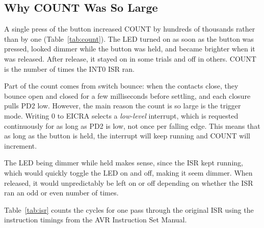 \documentclass[11pt]{article}
\begin{document}
\subsection{Why COUNT Was So Large}
A single press of the button increased COUNT by hundreds of thousands rather than by one (Table~\ref{tab:count}). The LED turned on as soon as the button was pressed, looked dimmer while the button was held, and became brighter when it was released. After release, it stayed on in some trials and off in others. COUNT is the number of times the INT0 ISR ran.

Part of the count comes from switch bounce: when the contacts close, they bounce open and closed for a few milliseconds before settling, and each closure pulls PD2 low. However, the main reason the count is so large is the trigger mode. Writing 0 to EICRA selects a \emph{low-level} interrupt, which is requested continuously for as long as PD2 is low, not once per falling edge. This means that as long as the button is held, the interrupt will keep running and COUNT will increment.

The LED being dimmer while held makes sense, since the ISR kept running, which would quickly toggle the LED on and off, making it seem dimmer. When released, it would unpredictably be left on or off depending on whether the ISR ran an odd or even number of times.

Table~\ref{tab:isr} counts the cycles for one pass through the original ISR using the instruction timings from the AVR Instruction Set Manual.
\end{document}

